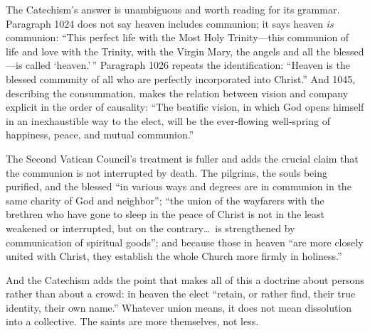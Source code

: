 The Catechism's answer is unambiguous and worth reading for its grammar. Paragraph 1024 does not say heaven includes communion; it says heaven \emph{is} communion: ``This perfect life with the Most Holy Trinity---this communion of life and love with the Trinity, with the Virgin Mary, the angels and all the blessed---is called `heaven.'\,'' Paragraph 1026 repeats the identification: ``Heaven is the blessed community of all who are perfectly incorporated into Christ.'' And 1045, describing the consummation, makes the relation between vision and company explicit in the order of causality: ``The beatific vision, in which God opens himself in an inexhaustible way to the elect, will be the ever-flowing well-spring of happiness, peace, and mutual communion.''

The Second Vatican Council's treatment is fuller and adds the crucial claim that the communion is not interrupted by death. The pilgrims, the souls being purified, and the blessed ``in various ways and degrees are in communion in the same charity of God and neighbor''; ``the union of the wayfarers with the brethren who have gone to sleep in the peace of Christ is not in the least weakened or interrupted, but on the contrary\ldots\ is strengthened by communication of spiritual goods''; and because those in heaven ``are more closely united with Christ, they establish the whole Church more firmly in holiness.''

And the Catechism adds the point that makes all of this a doctrine about persons rather than about a crowd: in heaven the elect ``retain, or rather find, their true identity, their own name.'' Whatever union means, it does not mean dissolution into a collective. The saints are more themselves, not less.

